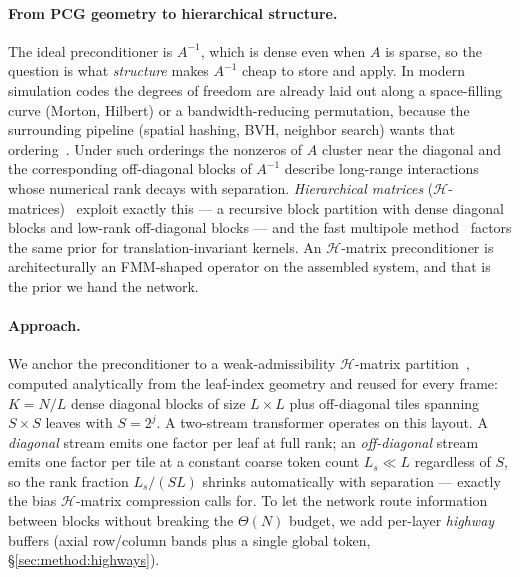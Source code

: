 \documentclass[acmtog]{acmart}
\theoremstyle{plain}
\begin{document}
\paragraph{From PCG geometry to hierarchical structure.}
The ideal preconditioner is $A^{-1}$, which is dense even when $A$ is sparse, so the
question is what \emph{structure} makes $A^{-1}$ cheap to store and apply. In modern
simulation codes the degrees of freedom are already laid out along a space-filling
curve (Morton, Hilbert) or a bandwidth-reducing permutation, because the surrounding
pipeline (spatial hashing, BVH, neighbor search) wants that
ordering~\cite{karras2012maximizing,teschner2003optimized,ihmsen2011parallel}. Under
such orderings the nonzeros of $A$ cluster near the diagonal and the corresponding
off-diagonal blocks of $A^{-1}$ describe long-range interactions whose numerical rank
decays with separation. \emph{Hierarchical matrices}
($\mathcal{H}$-matrices)~\cite{hackbusch1999sparse,hackbusch2002adaptive,borm2003introduction}
exploit exactly this --- a recursive block partition with dense diagonal blocks and
low-rank off-diagonal blocks --- and the fast multipole method~\cite{greengard1987fast}
factors the same prior for translation-invariant kernels. An $\mathcal{H}$-matrix
preconditioner is architecturally an FMM-shaped operator on the assembled system, and
that is the prior we hand the network.

\paragraph{Approach.}\label{intro:hierarchical}\hypertarget{intro:hierarchical}{}%
We anchor the preconditioner to a weak-admissibility $\mathcal{H}$-matrix
partition~\cite{hackbusch2002adaptive}, computed analytically from the leaf-index
geometry and reused for every frame: $K\!=\!N/L$ dense diagonal blocks of size
$L\!\times\!L$ plus off-diagonal tiles spanning $S\!\times\!S$ leaves with $S\!=\!2^j$.
A two-stream transformer operates on this layout. A \emph{diagonal} stream emits one
factor per leaf at full rank; an \emph{off-diagonal} stream emits one factor per tile
at a constant coarse token count $L_s\!\ll\!L$ regardless of $S$, so the rank fraction
$L_s/(SL)$ shrinks automatically with separation --- exactly the bias $\mathcal{H}$-matrix
compression calls for. To let the network route information between blocks without
breaking the $\Theta(N)$ budget, we add per-layer \emph{highway} buffers (axial
row/column bands plus a single global token, \S\ref{sec:method:highways}).
\end{document}
